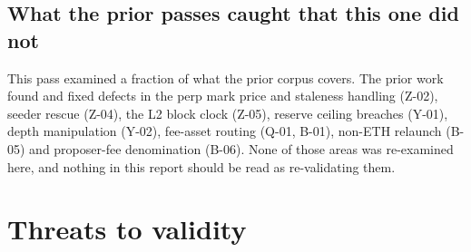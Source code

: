 \documentclass[11pt,a4paper]{article}
\begin{document}
\subsection{What the prior passes caught that this one did not}

This pass examined a fraction of what the prior corpus covers. The prior work found and
fixed defects in the perp mark price and staleness handling (Z-02), seeder rescue
(Z-04), the L2 block clock (Z-05), reserve ceiling breaches (Y-01), depth manipulation
(Y-02), fee-asset routing (Q-01, B-01), non-ETH relaunch (B-05) and proposer-fee
denomination (B-06). None of those areas was re-examined here, and nothing in this report
should be read as re-validating them.

\section{Threats to validity}\label{sec:validity}
\end{document}
